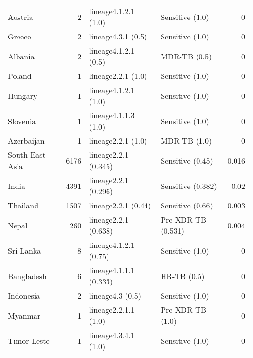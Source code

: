 \begin{tabular}{lrllr}
 Austria                                      &             2 & lineage4.1.2.1 (1.0)     & Sensitive (1.0)     &      0     \\
 Greece                                       &             2 & lineage4.3.1 (0.5)       & Sensitive (1.0)     &      0     \\
 Albania                                      &             2 & lineage4.1.2.1 (0.5)     & MDR-TB (0.5)        &      0     \\
 Poland                                       &             1 & lineage2.2.1 (1.0)       & Sensitive (1.0)     &      0     \\
 Hungary                                      &             1 & lineage4.1.2.1 (1.0)     & Sensitive (1.0)     &      0     \\
 Slovenia                                     &             1 & lineage4.1.1.3 (1.0)     & Sensitive (1.0)     &      0     \\
 Azerbaijan                                   &             1 & lineage2.2.1 (1.0)       & MDR-TB (1.0)        &      0     \\
 \hline

 South-East Asia                              &          6176 & lineage2.2.1 (0.345)     & Sensitive (0.45)    &      0.016 \\
 \hline

 India                                        &          4391 & lineage2.2.1 (0.296)     & Sensitive (0.382)   &      0.02  \\
 Thailand                                     &          1507 & lineage2.2.1 (0.44)      & Sensitive (0.66)    &      0.003 \\
 Nepal                                        &           260 & lineage2.2.1 (0.638)     & Pre-XDR-TB (0.531)  &      0.004 \\
 Sri Lanka                                    &             8 & lineage4.1.2.1 (0.75)    & Sensitive (1.0)     &      0     \\
 Bangladesh                                   &             6 & lineage4.1.1.1 (0.333)   & HR-TB (0.5)         &      0     \\
 Indonesia                                    &             2 & lineage4.3 (0.5)         & Sensitive (1.0)     &      0     \\
 Myanmar                                      &             1 & lineage2.2.1.1 (1.0)     & Pre-XDR-TB (1.0)    &      0     \\
 Timor-Leste                                  &             1 & lineage4.3.4.1 (1.0)     & Sensitive (1.0)     &      0     \\
 \hline


\end{tabular}
